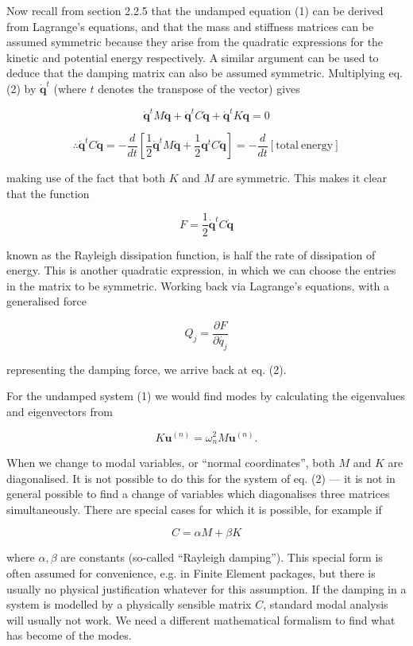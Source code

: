   Now recall from section 2.2.5 that the undamped equation (1) can be derived 
  from Lagrange's equations, and that the mass and stiffness matrices can be 
  assumed symmetric because they arise from the quadratic expressions for the 
  kinetic and potential energy respectively. A similar argument can be used to 
  deduce that the damping matrix can also be assumed symmetric. Multiplying eq. 
  (2) by $\dot{\mathbf{q}}^t$ (where $t$ denotes the transpose of the vector) 
  gives 

  $$\dot{\mathbf{q}}^t M \ddot{\mathbf{q}} + \dot{\mathbf{q}}^t C 
  \dot{\mathbf{q}} + \dot{\mathbf{q}}^t K \mathbf{q}= 0$$ 

  $$\therefore \dot{\mathbf{q}}^t C \dot{\mathbf{q}} = -\dfrac{d}{dt}\left[ 
  \dfrac{1}{2}\dot{\mathbf{q}}^t M \dot{\mathbf{q}} + \dfrac{1}{2}\mathbf{q}^t 
  C \dot{\mathbf{q}}\right] = -\dfrac{d}{dt}\left[ \mathrm{total~energy} 
  \right] \tag{3}$$ 

  making use of the fact that both $K$ and $M$ are symmetric. This makes it 
  clear that the function 

  $$F= \dfrac{1}{2} \dot{\mathbf{q}}^t C \dot{\mathbf{q}} \tag{4}$$ 

  known as the Rayleigh dissipation function, is half the rate of dissipation 
  of energy. This is another quadratic expression, in which we can choose the 
  entries in the matrix to be symmetric. Working back via Lagrange's equations, 
  with a generalised force 

  $$Q_j=\dfrac{\partial F}{\partial \dot{q_j}} \tag{5}$$ 

  representing the damping force, we arrive back at eq. (2). 

  For the undamped system (1) we would find modes by calculating the 
  eigenvalues and eigenvectors from 

  $$K \mathbf{u}^{(n)}=\omega_n^2 M \mathbf{u}^{(n)} . \tag{6}$$ 

  When we change to modal variables, or ``normal coordinates'', both $M$ and 
  $K$ are diagonalised. It is not possible to do this for the system of eq. (2) 
  — it is not in general possible to find a change of variables which 
  diagonalises three matrices simultaneously. There are special cases for which 
  it is possible, for example if 

  $$C= \alpha M + \beta K \tag{7}$$ 

  where $\alpha, \beta$ are constants (so-called ``Rayleigh damping''). This 
  special form is often assumed for convenience, e.g. in Finite Element 
  packages, but there is usually no physical justification whatever for this 
  assumption. If the damping in a system is modelled by a physically sensible 
  matrix $C$, standard modal analysis will usually not work. We need a 
  different mathematical formalism to find what has become of the modes. 

